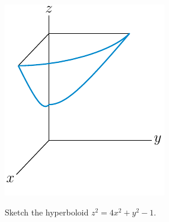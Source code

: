 \begin{solution}
\begin{center}
   \includegraphics{fig/OE253_11D_1bl.pdf}\qquad\qquad
\end{center}

\end{solution}

\begin{question}[M226 2009A] %
Sketch the hyperboloid $z^2=4x^2+y^2-1$.
\end{question}

%

